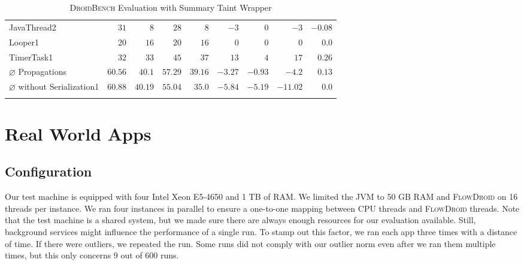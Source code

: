 \documentclass[../draft.tex]{subfiles}
\begin{document}
\begin{longtable}{l | r | r | r | r | r | r | r | r}
        JavaThread2 & $31$ & $8$ & $28$ & $8$ & $-3$ & $0$ & $-3$ & $-0.08$\\
        Looper1 & $20$ & $16$ & $20$ & $16$ & $0$ & $0$ & $0$ & $0.0$\\
        TimerTask1 & $32$ & $33$ & $45$ & $37$ & $13$ & $4$ & $17$ & $0.26$\\
        \hhline
        $\varnothing$ Propagations & $60.56$ & $40.1$ & $57.29$ & $39.16$ & $-3.27$ & $-0.93$ & $-4.2$ & $0.13$\\
        $\varnothing$ without Serialization1& $60.88$ & $40.19$ & $55.04$ & $35.0$ & $-5.84$ & $-5.19$ & $-11.02$ & $0.0$\\
        \caption{\textsc{DroidBench} Evaluation with Summary Taint Wrapper}
        \label{t:droidbenchevaluation_sum}
    \end{longtable}
    \normalsize

    \section{Real World Apps}\label{s:realworld}

    \subsection{Configuration}
    Our test machine is equipped with four Intel Xeon E5-4650 and 1 TB of RAM.
    We limited the JVM to 50 GB RAM and \textsc{FlowDroid} on 16 threads per instance.
    We ran four instances in parallel to ensure a one-to-one mapping between CPU threads and \textsc{FlowDroid} threads.
    Note that the test machine is a shared system, but we made sure there are always enough resources for our evaluation available.
    Still, background services might influence the performance of a single run. To stamp out this factor, we ran each app three times with a distance of time\footnotemark.
    If there were outliers\footnotemark{}, we repeated the run.
    Some runs did not comply with our outlier norm even after we ran them multiple times, but this only concerns 9 out of 600 runs.
\end{document}

